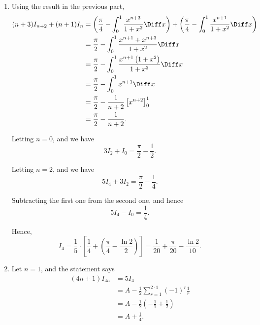 \begin{enumerate}
    \item Using the result in the previous part,
          \begin{align*}
              (n + 3) I_{n + 2} + (n + 1) I_n & = \left(\frac{\pi}{4} - \int_{0}^{1} \frac{x^{n + 3}}{1 + x^2} \Diff x\right) + \left(\frac{\pi}{4} - \int_{0}^{1} \frac{x^{n + 1}}{1 + x^2} \Diff x\right) \\
                                              & = \frac{\pi}{2} - \int_{0}^{1} \frac{x^{n + 1} + x^{n + 3}}{1 + x^2} \Diff x                                                                                \\
                                              & = \frac{\pi}{2} - \int_{0}^{1} \frac{x^{n + 1} \left(1 + x^2\right)}{1 + x^2} \Diff x                                                                       \\
                                              & = \frac{\pi}{2} - \int_{0}^{1} x^{n + 1} \Diff x                                                                                                            \\
                                              & = \frac{\pi}{2} - \frac{1}{n + 2} \left[x^{n + 2}\right]_{0}^{1}                                                                                            \\
                                              & = \frac{\pi}{2} - \frac{1}{n + 2}.
          \end{align*}

          Letting \(n = 0\), and we have
          \[
              3 I_2 + I_0 = \frac{\pi}{2} - \frac{1}{2}.
          \]


          Letting \(n = 2\), and we have
          \[
              5 I_4 + 3 I_2 = \frac{\pi}{2} - \frac{1}{4}.
          \]

          Subtracting the first one from the second one, and hence
          \[
              5 I_4 - I_0 = \frac{1}{4}.
          \]

          Hence,
          \[
              I_4 = \frac{1}{5} \cdot \left[\frac{1}{4} + \left(\frac{\pi}{4} - \frac{\ln 2}{2}\right)\right] = \frac{1}{20} + \frac{\pi}{20} - \frac{\ln 2}{10}.
          \]

    \item Let \(n = 1\), and the statement says
          \begin{align*}
              (4n + 1) I_{4n} & = 5 I_4                                                      \\
                              & = A - \frac{1}{2} \sum_{r = 1}^{2 \cdot 1}(-1)^r \frac{1}{r} \\
                              & = A - \frac{1}{2} \left(- \frac{1}{1} + \frac{1}{2}\right)   \\
                              & = A + \frac{1}{4}.
          \end{align*}


\end{enumerate}
